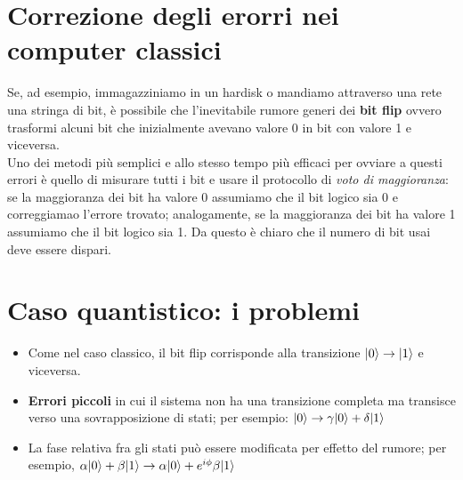 \documentclass[12pt, a4paper]{report}
\begin{document}
\section{Correzione degli erorri nei computer classici}
Se, ad esempio, immagazziniamo in un hardisk o mandiamo attraverso una rete una stringa di bit, è possibile che l'inevitabile rumore generi dei \textbf{bit flip} ovvero trasformi alcuni bit che inizialmente avevano valore 0 in bit con valore 1 e viceversa.\\
Uno dei metodi più semplici e allo stesso tempo più efficaci per ovviare a questi errori è quello di  misurare tutti i bit e usare il protocollo di \textit{voto di maggioranza}: se la maggioranza dei bit ha valore 0 assumiamo che il bit logico sia 0 e correggiamao l'errore trovato; analogamente, se la maggioranza dei bit ha valore 1 assumiamo che il bit logico sia 1.
Da questo è chiaro che il numero di bit usai deve essere dispari.
\section{Caso quantistico: i problemi}
\begin{itemize}
    \item Come nel caso classico, il bit flip corrisponde alla transizione $| 0 \rangle\rightarrow| 1 \rangle$ e viceversa.
    \item \textbf{Errori piccoli} in cui il sistema non ha una transizione completa ma transisce verso una sovrapposizione di stati; per esempio: $| 0 \rangle\rightarrow\gamma| 0 \rangle+\delta| 1 \rangle$
    \item La fase relativa fra gli stati può essere modificata per effetto del rumore; per esempio, $\alpha| 0 \rangle+\beta| 1 \rangle\rightarrow\alpha| 0 \rangle+e^{i\phi}\beta| 1 \rangle$
\end{itemize}
\end{document}

